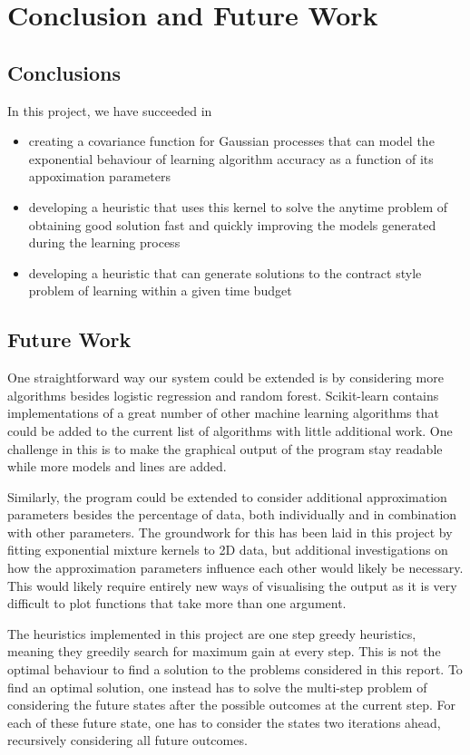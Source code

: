 \documentclass[a4paper,12pt,twoside,openright]{report}
\begin{document}
\chapter{Conclusion and Future Work} 
\section{Conclusions}
In this project, we have succeeded in
\begin{itemize}
	\item creating a covariance function for Gaussian processes that can model the exponential behaviour of learning algorithm accuracy as a function of its appoximation parameters
	\item developing a heuristic that uses this kernel to solve the anytime problem of obtaining good solution fast and quickly improving the models generated during the learning process
	\item developing a heuristic that can generate solutions to the contract style problem of learning within a given time budget
\end{itemize}





\section{Future Work}
One straightforward way our system could be extended is by considering more algorithms besides logistic regression and random forest. Scikit-learn contains implementations of a great number of other machine learning algorithms that could be added to the current list of algorithms with little additional work. One challenge in this is to make the graphical output of the program stay readable while more models and lines are added.

Similarly, the program could be extended to consider additional approximation parameters besides the percentage of data, both individually and in combination with other parameters. The groundwork for this has been laid in this project by fitting exponential mixture kernels to 2D data, but additional investigations on how the approximation parameters influence each other would likely be necessary. This would likely require entirely new ways of visualising the output as it is very difficult to plot functions that take more than one argument.

The heuristics implemented in this project are one step greedy heuristics, meaning they greedily search for maximum gain at every step. This is not the optimal behaviour to find a solution to the problems considered in this report. To find an optimal solution, one instead has to solve the multi-step problem of considering the future states after the possible outcomes at the current step. For each of these future state, one has to consider the states two iterations ahead, recursively considering all future outcomes.
\end{document}
